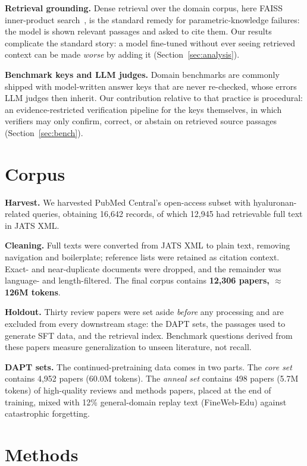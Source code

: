 \documentclass[11pt]{article}
\begin{document}
\textbf{Retrieval grounding.} Dense retrieval over the domain corpus,
here FAISS inner-product search~\cite{faiss}, is the standard remedy for
parametric-knowledge failures: the model is shown relevant passages
and asked to cite them. Our results complicate the standard story: a
model fine-tuned without ever seeing retrieved context can be made
\emph{worse} by adding it (Section~\ref{sec:analysis}).

\textbf{Benchmark keys and LLM judges.} Domain benchmarks are commonly
shipped with model-written answer keys that are never re-checked, whose
errors LLM judges then inherit. Our contribution relative to that
practice is procedural: an evidence-restricted verification pipeline for
the keys themselves, in which verifiers may only confirm, correct, or
abstain on retrieved source passages
(Section~\ref{sec:bench}).

\section{Corpus}
\label{sec:corpus}

\textbf{Harvest.} We harvested PubMed Central's open-access subset with
hyaluronan-related queries, obtaining 16,642 records, of which 12,945
had retrievable full text in JATS XML.

\textbf{Cleaning.} Full texts were converted from JATS XML to plain text,
removing navigation and boilerplate; reference lists were retained as
citation context. Exact- and
near-duplicate documents were dropped, and the remainder was language-
and length-filtered. The final corpus contains
\textbf{12,306 papers, $\approx$126M tokens}.

\textbf{Holdout.} Thirty review papers were set aside \emph{before} any
processing and are excluded from every downstream stage: the DAPT sets,
the passages used to generate SFT data, and the retrieval index.
Benchmark questions derived from these papers measure
generalization to unseen literature, not recall.

\textbf{DAPT sets.} The continued-pretraining data comes in two parts.
The \emph{core set} contains 4,952 papers (60.0M tokens). The
\emph{anneal set} contains 498 papers (5.7M tokens) of high-quality
reviews and methods papers, placed at the end of training, mixed with
12\% general-domain replay text (FineWeb-Edu) against catastrophic
forgetting.

\section{Methods}
\label{sec:methods}
\end{document}
